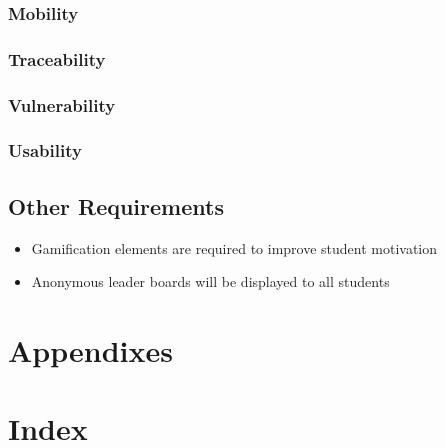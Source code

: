 \documentclass[a4paper,12pt]{article}
\begin{document}
        	\subsubsection{Mobility}
        	\subsubsection{Traceability}
        	\subsubsection{Vulnerability}
        	\subsubsection{Usability}
        \subsection{Other Requirements}
        \begin{itemize}
        \item Gamification elements are required to improve student motivation
        \item Anonymous leader boards will be displayed to all students
        \end{itemize}
    \section{Appendixes}
    
    \section{Index}
    
    \pagebreak  
\end{document}
